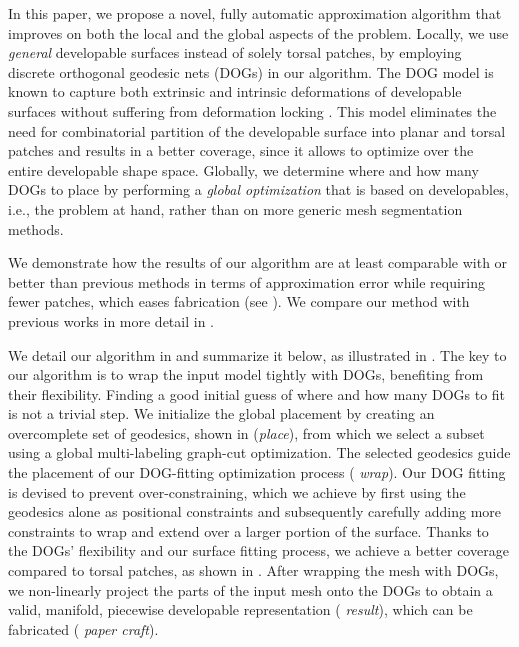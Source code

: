 In this paper, we propose a novel, fully automatic approximation algorithm that improves on both the local and the global aspects of the problem. 
Locally, we use \emph{general} developable surfaces instead of solely torsal patches, by employing discrete orthogonal geodesic nets (DOGs) \cite{Rabinovich:DogNets:2018,Rabinovich:DogShapeSpace:2018} in our algorithm. The DOG model is known to capture both extrinsic and intrinsic deformations of developable surfaces without suffering from deformation locking \cite{locking1,locking2,Tang:InteractiveDevelopables:2016}. This model eliminates the need for combinatorial partition of the developable surface into planar and torsal patches and results in a better coverage, since it allows to optimize over the entire developable shape space.
Globally, we determine where and how many DOGs to place by performing a \emph{global optimization} that is based on developables, i.e., the problem at hand, rather than on more generic mesh segmentation methods.  

We demonstrate how the results of our algorithm are at least comparable with or better than previous methods in terms of approximation error while requiring fewer patches, which eases fabrication (see ). We compare our method with previous works in more detail in . 

We detail our algorithm in  and summarize it below, as illustrated in . 
The key to our algorithm is to wrap the input model tightly with DOGs, benefiting from their flexibility. 
Finding a good initial guess of where and how many DOGs to fit is not a trivial step. We initialize the global placement by creating an overcomplete set of geodesics, shown in  (\emph{place}), from which we select a subset using a global multi-labeling graph-cut optimization. 
The selected geodesics guide the placement of our DOG-fitting optimization process ( \emph{wrap}). Our DOG fitting is devised to prevent over-constraining, which we achieve by first using the geodesics alone as positional constraints and subsequently carefully adding more constraints to wrap and extend over a larger portion of the surface. Thanks to the DOGs' flexibility and our surface fitting process, we achieve a better coverage compared to torsal patches, as shown in .
After wrapping the mesh with DOGs, we non-linearly project the parts of the input mesh onto the DOGs to obtain a valid, manifold, piecewise developable representation ( \emph{result}), which can be fabricated ( \emph{paper craft}). %


